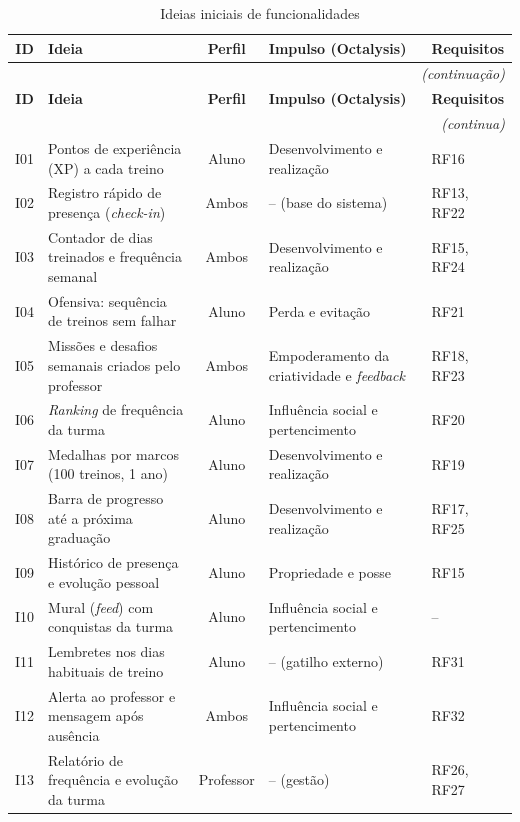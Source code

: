 \begin{quadrolongo}
\begin{longtable}{|c|p{4.6cm}|c|p{3.9cm}|p{2.0cm}|}
  \caption{Ideias iniciais de funcionalidades}\label{qua:ideias}\\
  \hline
  \textbf{ID} & \textbf{Ideia} & \textbf{Perfil} & \textbf{Impulso (Octalysis)} & \textbf{Requisitos} \\ \hline
\endfirsthead
  \multicolumn{5}{r}{\textit{(continuação)}}\\
  \hline
  \textbf{ID} & \textbf{Ideia} & \textbf{Perfil} & \textbf{Impulso (Octalysis)} & \textbf{Requisitos} \\ \hline
\endhead
  \multicolumn{5}{r}{\textit{(continua)}}\\
\endfoot
\endlastfoot
    I01 & Pontos de experiência (XP) a cada treino & Aluno & Desenvolvimento e realização & RF16 \\ \hline
    I02 & Registro rápido de presença (\textit{check-in}) & Ambos & -- (base do sistema) & RF13, RF22 \\ \hline
    I03 & Contador de dias treinados e frequência semanal & Ambos & Desenvolvimento e realização & RF15, RF24 \\ \hline
    I04 & Ofensiva: sequência de treinos sem falhar & Aluno & Perda e evitação & RF21 \\ \hline
    I05 & Missões e desafios semanais criados pelo professor & Ambos & Empoderamento da criatividade e \textit{feedback} & RF18, RF23 \\ \hline
    I06 & \textit{Ranking} de frequência da turma & Aluno & Influência social e pertencimento & RF20 \\ \hline
    I07 & Medalhas por marcos (100 treinos, 1 ano) & Aluno & Desenvolvimento e realização & RF19 \\ \hline
    I08 & Barra de progresso até a próxima graduação & Aluno & Desenvolvimento e realização & RF17, RF25 \\ \hline
    I09 & Histórico de presença e evolução pessoal & Aluno & Propriedade e posse & RF15 \\ \hline
    I10 & Mural (\textit{feed}) com conquistas da turma & Aluno & Influência social e pertencimento & -- \\ \hline
    I11 & Lembretes nos dias habituais de treino & Aluno & -- (gatilho externo) & RF31 \\ \hline
    I12 & Alerta ao professor e mensagem após ausência & Ambos & Influência social e pertencimento & RF32 \\ \hline
    I13 & Relatório de frequência e evolução da turma & Professor & -- (gestão) & RF26, RF27 \\ \hline
\end{longtable}
\end{quadrolongo}

